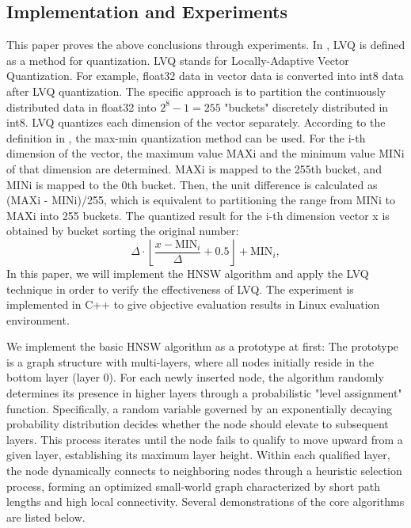 \documentclass[sigconf, nonacm]{acmart}
\begin{document}
\subsection{Implementation and Experiments}
This paper proves the above conclusions through experiments. In \cite{aguerrebere2023similarity}, LVQ is defined as a method for quantization. LVQ stands for Locally-Adaptive Vector Quantization. For example, float32 data in vector data is converted into int8 data after LVQ quantization. The specific approach is to partition the continuously distributed data in float32 into $2^8 - 1 = 255$ "buckets" discretely distributed in int8. LVQ quantizes each dimension of the vector separately. According to the definition in \cite{aguerrebere2023similarity}, the max-min quantization method can be used. For the i-th dimension of the vector, the maximum value MAXi and the minimum value MINi of that dimension are determined. MAXi is mapped to the 255th bucket, and MINi is mapped to the 0th bucket. Then, the unit difference is calculated as (MAXi - MINi)/255, which is equivalent to partitioning the range from MINi to MAXi into 255 buckets. The quantized result for the i-th dimension vector x is obtained by bucket sorting the original number:
\begin{displaymath}
\Delta \cdot \left\lfloor \frac{x - \text{MIN}_i}{\Delta} + 0.5 \right\rfloor + \text{MIN}_i,
\end{displaymath}
In this paper, we will implement the HNSW algorithm and apply the LVQ technique in order to verify the effectiveness of LVQ. The experiment is implemented in C++ to give objective evaluation results in Linux evaluation environment.

We implement the basic HNSW algorithm as a prototype at first:
The prototype is a graph structure with multi-layers, where all nodes initially reside in the bottom layer (layer 0). For each newly inserted node, the algorithm randomly determines its presence in higher layers through a probabilistic "level assignment" function. Specifically, a random variable governed by an exponentially decaying probability distribution decides whether the node should elevate to subsequent layers. This process iterates until the node fails to qualify to move upward from a given layer, establishing its maximum layer height. Within each qualified layer, the node dynamically connects to neighboring nodes through a heuristic selection process, forming an optimized small-world graph characterized by short path lengths and high local connectivity.
Several demonstrations of the core algorithms are listed below.
\end{document}
